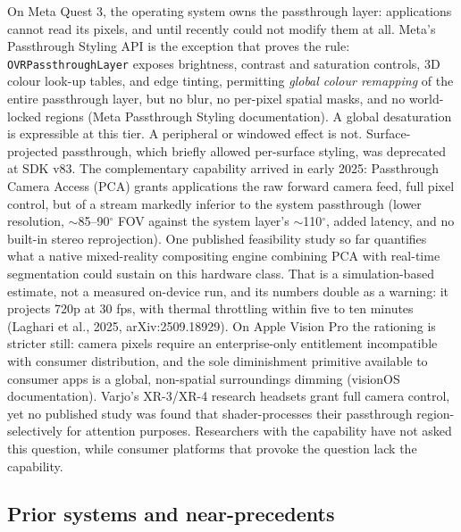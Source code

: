 On Meta Quest 3, the operating system owns the passthrough layer: applications cannot read its
pixels, and until recently could not modify them at all. Meta's Passthrough Styling API is the
exception that proves the rule: \verb|OVRPassthroughLayer| exposes brightness, contrast and saturation
controls, 3D colour look-up tables, and edge tinting, permitting \textit{global colour remapping} of the
entire passthrough layer, but no blur, no per-pixel spatial masks, and no world-locked regions
(Meta Passthrough Styling documentation). A global desaturation is expressible at this tier. A
peripheral or windowed effect is not. Surface-projected passthrough, which briefly allowed
per-surface styling, was deprecated at SDK v83. The complementary capability arrived in early 2025:
Passthrough Camera Access (PCA) grants applications the raw forward camera feed, full pixel
control, but of a stream markedly inferior to the system passthrough (lower resolution, $\sim$85–90$^{\circ}$
FOV against the system layer's $\sim$110$^{\circ}$, added latency, and no built-in stereo reprojection). One
published feasibility study so far quantifies what a native mixed-reality compositing engine
combining PCA with real-time segmentation could sustain on this hardware class. That is a
simulation-based estimate, not a measured on-device run, and its numbers double as a warning: it
projects 720p at 30 fps, with thermal throttling within five to ten minutes (Laghari et al., 2025,
arXiv:2509.18929). On Apple Vision Pro the rationing is stricter still: camera pixels require an
enterprise-only entitlement incompatible with consumer distribution, and the sole diminishment
primitive available to consumer apps is a global, non-spatial surroundings dimming (visionOS
documentation). Varjo's XR-3/XR-4 research headsets grant full camera control, yet no published study
was found that shader-processes their passthrough region-selectively for attention purposes.
Researchers with the capability have not asked this question, while consumer platforms that provoke
the question lack the capability.

\subsection{Prior systems and near-precedents}


